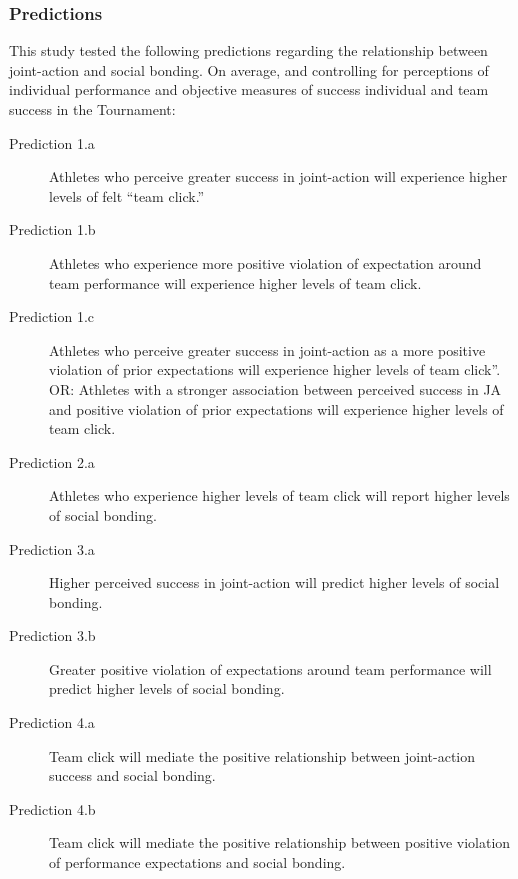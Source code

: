 
\subsubsection{Predictions}
This study tested the following predictions regarding the relationship between joint-action and social bonding.  On average, and controlling for perceptions of individual performance and objective measures of success individual and team success in the Tournament:
\begin{indent}
\begin{description}
  \item [Prediction 1.a] Athletes who perceive greater success in joint-action will experience higher levels of felt  ``team click.''
  \item [Prediction 1.b] Athletes who experience more positive violation of expectation around team performance will experience higher levels of team click.
  \item [Prediction 1.c] Athletes who perceive greater success in joint-action as a more positive violation of prior expectations will experience higher levels of team click”.
  OR: Athletes with a stronger association between perceived success in JA and positive violation of prior expectations will experience higher levels of team click.  \\

  \item [Prediction 2.a] Athletes who experience higher levels of team click will report higher levels of social bonding.
  \bigskip
  \item [Prediction 3.a] Higher perceived success in joint-action will predict higher levels of social bonding.
 \item [Prediction 3.b] Greater positive violation of expectations around team performance will predict higher levels of social bonding.
  \item [Prediction 4.a] Team click will mediate the positive relationship between joint-action success and social bonding.
  \item [Prediction 4.b] Team click will mediate the positive relationship between positive violation of performance expectations and social bonding.
\end{description}
\end{indent}




